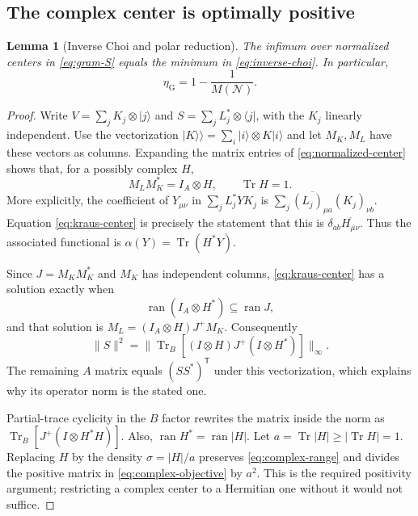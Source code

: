\documentclass[11pt]{article}
\numberwithin{equation}{section}
\newtheorem{lemma}[theorem]{Lemma}
\theoremstyle{definition}
\theoremstyle{remark}
\DeclareMathOperator{\Tr}{Tr}
\DeclareMathOperator{\ran}{ran}
\newcommand{\N}{\mathcal N}
\newcommand{\ket}[1]{\lvert #1\rangle}
\newcommand{\bra}[1]{\langle #1\rvert}
\newcommand{\norm}[1]{\lVert #1\rVert}
\begin{document}
\subsection{The complex center is optimally positive}

\begin{lemma}[Inverse Choi and polar reduction]
\label{lem:polar}
The infimum over normalized centers in \eqref{eq:gram-S} equals the
minimum in \eqref{eq:inverse-choi}. In particular,
\[
 \eta_{\mathrm G}=1-\frac1{M(\N)}.
\]
\end{lemma}

\begin{proof}
Write
$V=\sum_j K_j\otimes\ket j$ and
$S=\sum_j L_j^*\otimes\bra j$, with the $K_j$ linearly independent.
Use the vectorization
$\ket{K}\!\rangle=\sum_i\ket i\otimes K\ket i$ and let $M_K,M_L$
have these vectors as columns. Expanding the matrix entries of
\eqref{eq:normalized-center} shows that, for a possibly complex $H$,
\begin{equation}
 M_LM_K^*=I_A\otimes H,\qquad \Tr H=1.
 \label{eq:kraus-center}
\end{equation}
More explicitly, the coefficient of $Y_{\mu\nu}$ in
$\sum_j L_j^*YK_j$ is
$\sum_j\overline{(L_j)_{\mu a}}(K_j)_{\nu b}$.
Equation \eqref{eq:kraus-center} is precisely the statement that this is
$\delta_{ab}\overline{H_{\mu\nu}}$.
Thus the associated functional is $\alpha(Y)=\Tr(H^*Y)$.

Since $J=M_KM_K^*$ and $M_K$ has independent columns,
\eqref{eq:kraus-center} has a solution exactly when
\begin{equation}
 \ran(I_A\otimes H^*)\subseteq\ran J,
 \label{eq:complex-range}
\end{equation}
and that solution is
$M_L=(I_A\otimes H)J^+M_K$. Consequently
\begin{equation}
 \norm S^2=
 \norm{\Tr_B[(I\otimes H)J^+(I\otimes H^*)]}_\infty .
 \label{eq:complex-objective}
\end{equation}
The remaining $A$ matrix equals $(SS^*)^{\mathsf T}$ under this
vectorization, which explains why its operator norm is the stated one.

Partial-trace cyclicity in the $B$ factor rewrites the matrix inside the
norm as $\Tr_B[J^+(I\otimes H^*H)]$. Also,
$\ran H^*=\ran|H|$. Let $a=\Tr|H|\geq|\Tr H|=1$.
Replacing $H$ by the density $\sigma=|H|/a$ preserves
\eqref{eq:complex-range} and divides the positive matrix in
\eqref{eq:complex-objective} by $a^2$.
This is the required positivity argument; restricting a complex center to a
Hermitian one without it would not suffice.


\end{proof}
\end{document}
